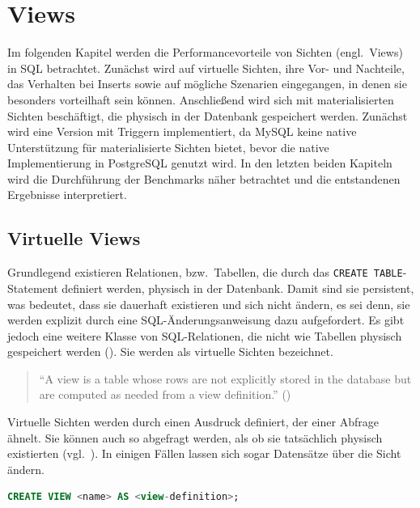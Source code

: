 
\chapter{Views}\label{ch:views}
Im folgenden Kapitel werden die Performancevorteile von Sichten (engl.\ Views) in SQL betrachtet.
Zunächst wird auf virtuelle Sichten, ihre Vor- und Nachteile, das Verhalten bei Inserts sowie auf mögliche Szenarien eingegangen, in denen sie besonders vorteilhaft sein können.
Anschließend wird sich mit materialisierten Sichten beschäftigt, die physisch in der Datenbank gespeichert werden.
Zunächst wird eine Version mit Triggern implementiert, da MySQL keine native Unterstützung für materialisierte Sichten bietet, bevor die native Implementierung in PostgreSQL genutzt wird.
In den letzten beiden Kapiteln wird die Durchführung der Benchmarks näher betrachtet und die entstandenen Ergebnisse interpretiert.

\section{Virtuelle Views}\label{sec:virtuelle-views}

Grundlegend existieren Relationen, bzw.\ Tabellen, die durch das \texttt{CREATE TABLE}-Statement definiert werden, physisch in der Datenbank.
Damit sind sie persistent, was bedeutet, dass sie dauerhaft existieren und sich nicht ändern, es sei denn, sie werden explizit durch eine SQL-Änderungsanweisung dazu aufgefordert.
Es gibt jedoch eine weitere Klasse von SQL-Relationen, die nicht wie Tabellen physisch gespeichert werden (\cite[341--349, 353--366]{garcia2008database}).
Sie werden als virtuelle Sichten bezeichnet.

\begin{quote}
    \enquote{A view is a table whose rows are not explicitly stored in the database but are computed as needed from a view definition.} (\cite[S. 86]{ramakrishnan2002database})
\end{quote}

Virtuelle Sichten werden durch einen Ausdruck definiert, der einer Abfrage ähnelt.
Sie können auch so abgefragt werden, als ob sie tatsächlich physisch existierten (vgl.\ \cite[S. 87]{ramakrishnan2002database}).
In einigen Fällen lassen sich sogar Datensätze über die Sicht ändern.

\vspace{-10pt}
\begin{lstlisting}[language=SQL,caption=Allgemeine View-Deklaration,label={lst:create_view}]
CREATE VIEW <name> AS <view-definition>;
\end{lstlisting}
\vspace{-9pt}

